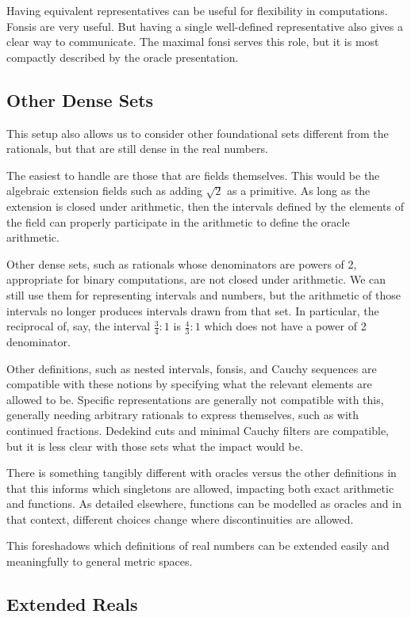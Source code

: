\documentclass[12pt]{article}
\begin{document}
Having equivalent representatives can be useful for flexibility in computations. Fonsis are very useful. But having a single well-defined representative also gives a clear way to communicate. The maximal fonsi serves this role, but it is most compactly described by the oracle presentation. 

\subsection{Other Dense Sets}

This setup also allows us to consider other foundational sets different from the rationals, but that are still dense in the real numbers. 

The easiest to handle are those that are fields themselves. This would be the algebraic extension fields such as adding $\sqrt{2}$ as a primitive. As long as the extension is closed under arithmetic, then the intervals defined by the elements of the field can properly participate in the arithmetic to define the oracle arithmetic. 

Other dense sets, such as rationals whose denominators are powers of 2, appropriate for binary computations, are not closed under arithmetic. We can still use them for representing intervals and numbers, but the arithmetic of those intervals no longer produces intervals drawn from that set. In particular, the reciprocal of, say, the interval $\frac{3}{4}:1$ is $\frac{4}{3}:1$ which does not have a power of 2 denominator.  

Other definitions, such as nested intervals, fonsis, and Cauchy sequences are compatible with these notions by specifying what the relevant elements are allowed to be. Specific representations are generally not compatible with this, generally needing arbitrary rationals to express themselves, such as with continued fractions. Dedekind cuts and minimal Cauchy filters are compatible, but it is less clear with those sets what the impact would be. 

There is something tangibly different with oracles versus the other definitions in that this informs which singletons are allowed, impacting both exact arithmetic and functions. As detailed elsewhere, functions can be modelled as oracles and in that context, different choices change where discontinuities are allowed. 

This foreshadows which definitions of real numbers can be extended easily and meaningfully to general metric spaces. 


\subsection{Extended Reals}
\end{document}
